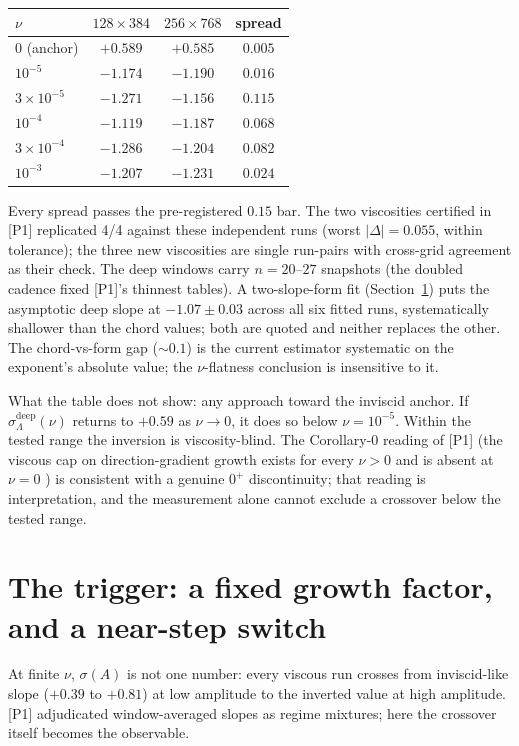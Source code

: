 \documentclass[11pt]{article}
\newcommand{\sL}{\sigma_{\!\Lambda}}
\begin{document}
\begin{center}
\begin{tabular}{lccc}
\toprule
$\nu$ & $128\times384$ & $256\times768$ & spread \\
\midrule
$0$ (anchor) & $+0.589$ & $+0.585$ & $0.005$ \\
$10^{-5}$ & $-1.174$ & $-1.190$ & $0.016$ \\
$3\times10^{-5}$ & $-1.271$ & $-1.156$ & $0.115$ \\
$10^{-4}$ & $-1.119$ & $-1.187$ & $0.068$ \\
$3\times10^{-4}$ & $-1.286$ & $-1.204$ & $0.082$ \\
$10^{-3}$ & $-1.207$ & $-1.231$ & $0.024$ \\
\bottomrule
\end{tabular}
\end{center}

Every spread passes the pre-registered $0.15$ bar. The two viscosities
certified in [P1] replicated 4/4 against these independent runs (worst
$|\Delta|=0.055$, within tolerance); the three new viscosities are
single run-pairs with cross-grid agreement as their check. The deep
windows carry $n=20$--$27$ snapshots (the doubled cadence fixed [P1]'s
thinnest tables). A two-slope-form fit (Section~\ref{sec:trigger}) puts
the asymptotic deep slope at $-1.07\pm0.03$ across all six fitted runs,
systematically shallower than the chord values; both are quoted and
neither replaces the other. The chord-vs-form gap (${\sim}0.1$) is the
current estimator systematic on the exponent's absolute value; the
$\nu$-flatness conclusion is insensitive to it.

What the table does not show: any approach toward the inviscid anchor.
If $\sL^{\mathrm{deep}}(\nu)$ returns to $+0.59$ as $\nu\to0$, it does
so below $\nu=10^{-5}$. Within the tested range the inversion is
viscosity-blind. The Corollary-0 reading of [P1] (the viscous cap on
direction-gradient growth exists for every $\nu>0$ and is absent at
$\nu=0$ \cite{Con94}) is consistent with a genuine $0^{+}$
discontinuity; that reading is interpretation, and the measurement
alone cannot exclude a crossover below the tested range.

\section{The trigger: a fixed growth factor, and a near-step switch}
\label{sec:trigger}

At finite $\nu$, $\sigma(A)$ is not one number: every viscous run
crosses from inviscid-like slope ($+0.39$ to $+0.81$) at low amplitude
to the inverted value at high amplitude. [P1] adjudicated
window-averaged slopes as regime mixtures; here the crossover itself
becomes the observable.
\end{document}
